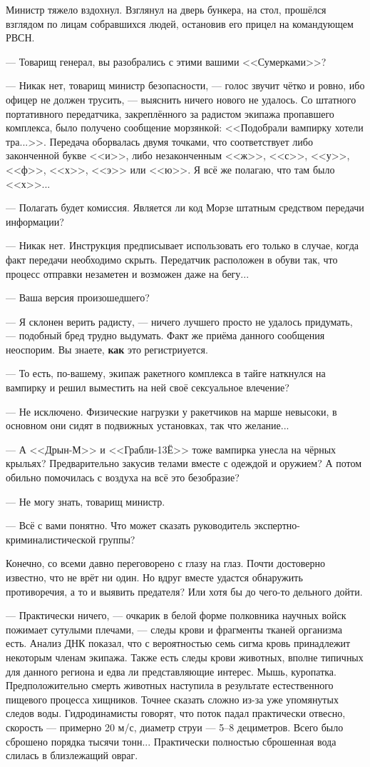 Министр тяжело вздохнул. Взглянул на дверь бункера, на стол, прошёлся взглядом по лицам собравшихся людей,
остановив его прицел на командующем РВСН.

--- Товарищ генерал, вы разобрались с этими вашими <<Сумерками>>?

--- Никак нет, товарищ министр безопасности, --- голос звучит чётко и ровно, ибо офицер не должен трусить,
--- выяснить ничего нового не удалось. Со штатного портативного передатчика,
закреплённого за радистом экипажа пропавшего комплекса, было получено сообщение морзянкой:
<<Подобрали вампирку хотели тра...>>. Передача оборвалась двумя точками, что соответствует либо законченной букве <<и>>,
либо незаконченным <<ж>>, <<с>>, <<у>>, <<ф>>, <<х>>, <<э>> или <<ю>>. Я всё же полагаю, что там было <<х>>...

--- Полагать будет комиссия. Является ли код Морзе штатным средством передачи информации?

--- Никак нет. Инструкция предписывает использовать его только в случае, когда факт передачи необходимо скрыть.
Передатчик расположен в обуви так, что процесс отправки незаметен и возможен даже на бегу...

--- Ваша версия произошедшего?

--- Я склонен верить радисту, --- ничего лучшего просто не удалось придумать, --- подобный бред трудно выдумать.
 Факт же приёма данного сообщения неоспорим. Вы знаете, \textbf{как} это регистриуется.

--- То есть, по-вашему, экипаж ракетного комплекса в тайге наткнулся на вампирку и решил
выместить на ней своё сексуальное влечение?

--- Не исключено. Физические нагрузки у ракетчиков на марше невысоки, в основном они сидят в подвижных установках,
так что желание...

--- А <<Дрын-М>> и <<Грабли-13Ё>> тоже вампирка унесла на чёрных крыльях?
Предварительно закусив телами вместе с одеждой и оружием? А потом обильно помочилась с воздуха на всё это безобразие?

--- Не могу знать, товарищ министр.

--- Всё с вами понятно. Что может сказать руководитель экспертно-криминалистической группы?

Конечно, со всеми давно переговорено с глазу на глаз. Почти достоверно известно, что не врёт ни один.
Но вдруг вместе удастся обнаружить противоречия, а то и выявить предателя? Или хотя бы до чего-то дельного дойти.

--- Практически ничего, --- очкарик в белой форме полковника научных войск пожимает сутулыми плечами,
--- следы крови и фрагменты тканей организма есть.
Анализ ДНК показал, что с вероятностью семь сигма кровь принадлежит некоторым членам экипажа.
Также есть следы крови животных, вполне типичных для данного региона и едва ли представляющие интерес.
Мышь, куропатка. Предположительно смерть животных наступила в результате естественного пищевого процесса хищников.
Точнее сказать сложно из-за уже упомянутых следов воды.
Гидродинамисты говорят, что поток падал практически отвесно, скорость --- примерно 20 м/с,
диаметр струи --- 5--8 дециметров. Всего было сброшено порядка тысячи тонн...
Практически полностью сброшенная вода слилась в близлежащий овраг.

